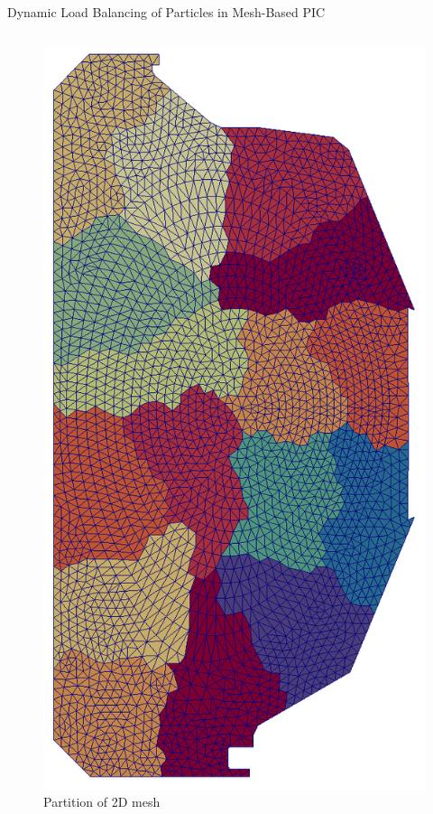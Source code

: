 \documentclass[aspectratio=169]{beamer}
\begin{document}
\begin{frame}{Dynamic Load Balancing of Particles in Mesh-Based PIC}
\begin{columns}
\begin{column}{0.3\linewidth}
\begin{figure}
        \includegraphics[height=.35\textheight]{xgcm_partition.png}
        \caption*{Partition of 2D mesh}
      \end{figure}
      \vspace{-.25cm}
      \begin{figure}
        \centering

\end{figure}
\end{column}
\end{columns}
\end{frame}
\end{document}

